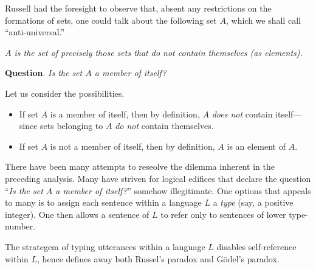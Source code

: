 Russell had the foresight to observe that, absent any restrictions on
the formations of sets, one could talk about the following set $A$,
which we shall call ``anti-universal.''

{\em $A$ is the set of precisely those sets that {\em do not} contain themselves
  (as elements).}

\noindent
{\bf Question}.  {\it Is the set $A$ a member of itself?}

\noindent
Let us consider the possibilities.
\begin{itemize}
\item
If set $A$ is a member of itself, then by definition, $A$ {\em does
  not} contain itself---since sets belonging to $A$ {\em do not}
contain themselves.

\item
If set $A$ is not a member of itself, then by definition, $A$ is an
element of $A$.
\end{itemize}

There have been many attempts to reseolve the dilemma inherent in the
preceding analysis.  Many have striven for logical edifices that
declare the question ``{\it Is the set $A$ a member of itself?}''
somehow illegitimate.  One options that appeals to many is to assign
each sentence within a language $L$ a {\it type} (say, a positive
integer).  One then allows a sentence of $L$ to refer only to
sentences of lower type-number.

The strategem of typing utterances within a language $L$ disables
self-reference within $L$, hence defines away both Russel's paradox
and G\"{o}del's paradox.



